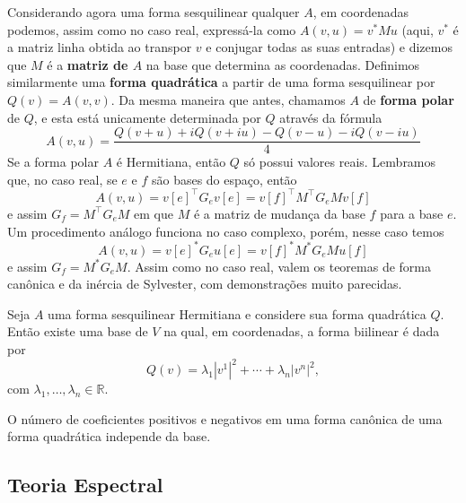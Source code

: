 Considerando agora uma forma sesquilinear qualquer $A$, em coordenadas podemos, assim como no caso real, expressá-la como $A(v, u) = v^* M u$ (aqui, $v^*$ é a matriz linha obtida ao transpor $v$ e conjugar todas as suas entradas) e dizemos que $M$ é a \textbf{matriz de $A$} na base que determina as coordenadas. Definimos similarmente uma \textbf{forma quadrática} a partir de uma forma sesquilinear por $Q(v) = A(v,v)$. Da mesma maneira que antes, chamamos $A$ de \textbf{forma polar} de $Q$, e esta está unicamente determinada por $Q$ através da fórmula \begin{equation}
    A(v, u) = \frac{Q(v+u) + iQ(v+iu) - Q(v-u) - iQ(v-iu)}{4}
\end{equation} Se a forma polar $A$ é Hermitiana, então $Q$ só possui valores reais. Lembramos que, no caso real, se $e$ e $f$ são bases do espaço, então \begin{equation}
    A(v,u) = v[e]^\top G_e v[e] = v[f]^\top M^\top G_e M v[f]
\end{equation} e assim $G_f = M^\top G_e M$ em que $M$ é a matriz de mudança da base $f$ para a base $e$. Um procedimento análogo funciona no caso complexo, porém, nesse caso temos \begin{equation}
    A(v,u) = v[e]^* G_e u[e] = v[f]^* M^* G_e M u[f]
\end{equation} e assim $G_f = M^* G_e M$. Assim como no caso real, valem os teoremas de forma canônica e da inércia de Sylvester, com demonstrações muito parecidas.

\begin{theorem}
    Seja $A$ uma forma sesquilinear Hermitiana e considere sua forma quadrática $Q$. Então existe uma base de $V$ na qual, em coordenadas, a forma biilinear é dada por \begin{equation}
        Q(v) = \lambda_1 |v^1|^2 + \cdots + \lambda_n |v^n|^2,
    \end{equation} com $\lambda_1, \dots, \lambda_n \in \mathbb{R}$.
\end{theorem}

\begin{theorem}
    O número de coeficientes positivos e negativos em uma forma canônica de uma forma quadrática independe da base.
\end{theorem}

\subsection{Teoria Espectral}

